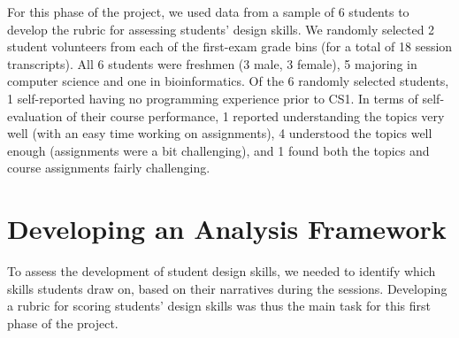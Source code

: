 For this phase of the project, we used data from a sample of 6 students to develop the rubric for assessing students' design skills. We randomly selected 2 student volunteers from each of the first-exam grade
bins (for a total of 18 session transcripts).
All 6 students were freshmen (3 male, 3 female), 5 majoring in computer science and one in bioinformatics. Of the 6 randomly selected
students, 1 self-reported having no programming experience prior to
CS1. In terms of self-evaluation of their course performance, 1
reported understanding the topics very well (with an easy time working
on assignments), 4 understood the topics well enough (assignments were
a bit challenging), and 1 found both the topics and course assignments fairly challenging.

\section{Developing an Analysis Framework}

To assess the development of student design skills, we needed to identify which skills students draw on, based on their narratives during the sessions. Developing a rubric for scoring students' design skills was thus the main task for this first phase of the project.

